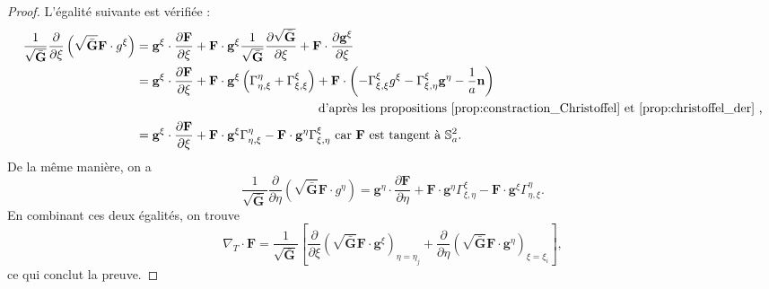 \begin{proof}
L'égalité suivante est vérifiée :
\begin{align*}
\dfrac{1}{\sqrt{\bar{\mathbf{G}}}} \dfrac{\partial}{\partial \xi} \left( \sqrt{\bar{\mathbf{G}}} \mathbf{F} \cdot g^{\xi} \right) & = \mathbf{g}^{\xi} \cdot \dfrac{\partial \mathbf{F}}{\partial \xi} + \mathbf{F} \cdot \mathbf{g}^{\xi} \dfrac{1}{\sqrt{\bar{\mathbf{G}}}} \dfrac{\partial \sqrt{\bar{\mathbf{G}}}}{\partial \xi} + \mathbf{F} \cdot \dfrac{\partial \mathbf{g}^{\xi}}{\partial \xi} \\
	& = \mathbf{g}^{\xi} \cdot \dfrac{\partial \mathbf{F}}{\partial \xi} + \mathbf{F} \cdot \mathbf{g}^{\xi} \left( \Gamma_{\eta,\xi}^{\eta} + \Gamma_{\xi,\xi}^{\xi} \right) + \mathbf{F} \cdot \left( - \Gamma_{\xi,\xi}^{\xi} g^{\xi} - \Gamma_{\xi,\eta}^{\xi} \mathbf{g}^{\eta} - \dfrac{1}{a} \mathbf{n} \right) \\
	& \hspace{5cm} \text{ d'après les propositions \ref{prop:constraction_Christoffel} et \ref{prop:christoffel_der} ,} \\
		& = \mathbf{g}^{\xi} \cdot \dfrac{\partial \mathbf{F}}{\partial \xi} + \mathbf{F} \cdot \mathbf{g}^{\xi} \Gamma_{\eta,\xi}^{\eta} - \mathbf{F} \cdot \mathbf{g}^{\eta} \Gamma_{\xi,\eta}^{\xi} \text{ car } \mathbf{F} \text{ est tangent à } \mathbb{S}_a^2.
\end{align*}
De la même manière, on a
\begin{equation}
\dfrac{1}{\sqrt{\bar{\mathbf{G}}}} \dfrac{\partial}{\partial \eta} \left( \sqrt{\bar{\mathbf{G}}} \mathbf{F} \cdot g^{\eta} \right) = \mathbf{g}^{\eta} \cdot \dfrac{\partial \mathbf{F}}{\partial \eta} + \mathbf{F} \cdot \mathbf{g}^{\eta} \Gamma_{\xi,\eta}^{\xi} - \mathbf{F} \cdot \mathbf{g}^{\xi} \Gamma_{\eta,\xi}^{\eta}.
\end{equation}
En combinant ces deux égalités, on trouve
\begin{equation}
\nabla_T \cdot \mathbf{F} = \dfrac{1}{\sqrt{\bar{\mathbf{G}}}} \left[ \dfrac{\partial}{\partial \xi} \left( \sqrt{\bar{\mathbf{G}}} \mathbf{F} \cdot \mathbf{g}^{\xi} \right)_{\eta = \eta_j} + 
\dfrac{\partial}{\partial \eta} \left( \sqrt{\bar{\mathbf{G}}} \mathbf{F} \cdot \mathbf{g}^{\eta} \right)_{\xi = \xi_i}
\right],
\end{equation}
ce qui conclut la preuve.
\end{proof}

